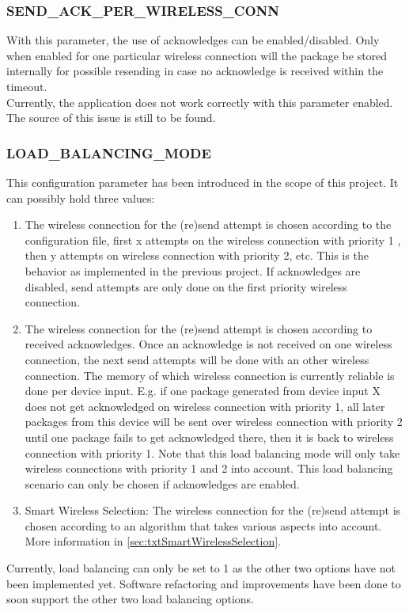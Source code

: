 \subsubsection{SEND\_ACK\_PER\_WIRELESS\_CONN}
With this parameter, the use of acknowledges can be enabled/disabled. Only when enabled for one particular wireless connection will the package be stored internally for possible resending in case no acknowledge is received within the timeout.\\
Currently, the application does not work correctly with this parameter enabled. The source of this issue is still to be found.
%
\subsubsection{LOAD\_BALANCING\_MODE}
This configuration parameter has been introduced in the scope of this project. It can possibly hold three values:
\begin{enumerate}
    \item The wireless connection for the (re)send attempt is chosen according to the configuration file, first x attempts on the wireless connection with priority 1 , then y attempts on wireless connection with priority 2, etc. This is the behavior as implemented in the previous project. If acknowledges are disabled, send attempts are only done on the first priority wireless connection.
    \item The wireless connection for the (re)send attempt is chosen according to received acknowledges. Once an acknowledge is not received on one wireless connection, the next send attempts will be done with an other wireless connection. The memory of which wireless connection is currently reliable is done per device input. E.g. if one package generated from device input X does not get acknowledged on wireless connection with priority 1, all later packages from this device will be sent over wireless connection with priority 2 until one package fails to get acknowledged there, then it is back to wireless connection with priority 1. Note that this load balancing mode will only take wireless connections with priority 1 and 2 into account. This load balancing scenario can only be chosen if acknowledges are enabled.
    \item Smart Wireless Selection: The wireless connection for the (re)send attempt is chosen according to an algorithm that takes various aspects into account. More information in \autoref{sec:txtSmartWirelessSelection}.
\end{enumerate}
Currently, load balancing can only be set to 1 as the other two options have not been implemented yet. Software refactoring and improvements have been done to soon support the other two load balancing options.
%
